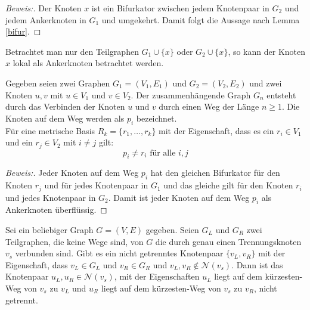\begin{proof}[Beweis:]
Der Knoten $x$ ist ein Bifurkator zwischen jedem Knotenpaar in $G_2$ und jedem Ankerknoten in $G_1$ und umgekehrt. Damit folgt die Aussage nach Lemma \ref{bifur}.
\end{proof}
Betrachtet man nur den Teilgraphen $G_1 \cup \{x\}$ oder $G_2 \cup \{x\}$, so kann der Knoten $x$ lokal als Ankerknoten betrachtet werden. 
\begin{lem}
\label{keinknotenvonwegindermd}
Gegeben seien zwei Graphen $G_1=(V_1,E_1)$ und $G_2=(V_2,E_2)$ und zwei Knoten $u,v$ mit $u \in V_1$ und $v \in V_2$.
Der zusammenhängende Graph $G_n$ entsteht durch das Verbinden der Knoten $u$ und $v$ durch einen Weg der Länge $n \geq 1$. Die Knoten auf dem Weg werden als $p_i$ bezeichnet.\\
Für eine metrische Basis $R_k= \{ r_1, \ldots , r_k \}$ mit der Eigenschaft, dass es ein $r_i \in V_1$ und ein $r_j \in V_2$  mit $i \neq j$ gilt:
\[p_i \neq r_i \text{ für alle } i,j\]
\end{lem}
\begin{proof}[Beweis:]
Jeder Knoten auf dem Weg $p_i$ hat den gleichen Bifurkator für den Knoten $r_j$ und für jedes Knotenpaar in $G_1$ und das gleiche gilt für den Knoten $r_i$ und jedes Knotenpaar in $G_2$. Damit ist jeder Knoten auf dem Weg $p_i$ als Ankerknoten überflüssig.
\end{proof}
\begin{lem}
\label{nachbartrennungsknoten}
Sei ein beliebiger Graph $G=(V,E)$ gegeben. Seien $G_L$ und $G_R$ zwei Teilgraphen, die keine Wege sind, von $G$ die durch genau einen Trennungsknoten $v_s$ verbunden sind. Gibt es ein nicht getrenntes Knotenpaar $\{v_L,v_R\}$ mit der Eigenschaft, dass $v_L\in G_L$ und $v_R \in G_R$ und $v_L, v_R \notin \mathcal{N}(v_s)$.\newline
Dann ist das Knotenpaar $u_L,u_R \in \mathcal{N}(v_s)$, mit der Eigenschaften $u_L$ liegt auf dem kürzesten-Weg von $v_s$ zu $v_L$ und $u_R$ liegt auf dem kürzesten-Weg von $v_s$ zu $v_R$, nicht getrennt.
\end{lem}
